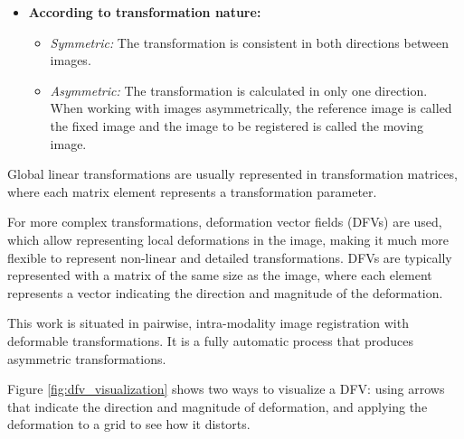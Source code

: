 \begin{itemize}
    \item \textbf{According to transformation nature:}
    \begin{itemize}
        \item \textit{Symmetric:} The transformation is consistent in both directions between images.
        \item \textit{Asymmetric:} The transformation is calculated in only one direction. When working with images asymmetrically, the reference image is called the fixed image and the image to be registered is called the moving image.
    \end{itemize}

\end{itemize}

Global linear transformations are usually represented in transformation matrices, where each matrix element represents a transformation parameter.

For more complex transformations, deformation vector fields (\gls{DFV}s) are used, which allow representing local deformations in the image, making it much more flexible to represent non-linear and detailed transformations.
DFVs are typically represented with a matrix of the same size as the image, where each element represents a vector indicating the direction and magnitude of the deformation.

This work is situated in pairwise, intra-modality image registration with deformable transformations. It is a fully automatic process that produces asymmetric transformations.

Figure \ref{fig:dfv_visualization} shows two ways to visualize a DFV: using arrows that indicate the direction and magnitude of deformation, and applying the deformation to a grid to see how it distorts.

